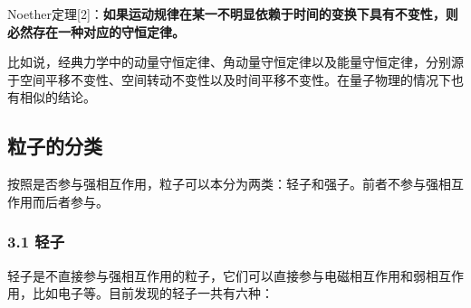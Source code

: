 Noether定理[2]：\textbf{如果运动规律在某一不明显依赖于时间的变换下具有不变性，则必然存在一种对应的守恒定律。}

比如说，经典力学中的动量守恒定律、角动量守恒定律以及能量守恒定律，分别源于空间平移不变性、空间转动不变性以及时间平移不变性。在量子物理的情况下也有相似的结论。

\subsection{粒子的分类}
按照是否参与强相互作用，粒子可以本分为两类：轻子和强子。前者不参与强相互作用而后者参与。

\subsubsection{3.1 轻子}
轻子是不直接参与强相互作用的粒子，它们可以直接参与电磁相互作用和弱相互作用，比如电子等。目前发现的轻子一共有六种：